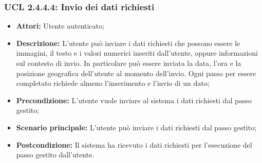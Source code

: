 \hypertarget{L2.4.4.4}{}
\subsubsection{UCL 2.4.4.4: Invio dei dati richiesti}
\begin{itemize}
\item \textbf{Attori:} Utente autenticato;
\item \textbf{Descrizione:} L'utente può inviare i dati richiesti che possono essere le immagini, il testo e i valori numerici inseriti dall'utente, oppure informazioni sul contesto di invio. In particolare può essere inviata la data, l'ora e la posizione geografica dell'utente al momento dell'invio. Ogni passo per essere completato richiede almeno l'inserimento e l'invio di un dato;
\item \textbf{Precondizione:} L'utente vuole inviare al sistema i dati richiesti dal passo gestito;
\item \textbf{Scenario principale:} L'utente può inviare i dati richiesti dal passo gestito;
\item \textbf{Postcondizione:} Il sistema ha ricevuto i dati richiesti per l'esecuzione del passo gestito dall'utente.
\end{itemize}

\hypertarget{L2.4.4.5}{}
